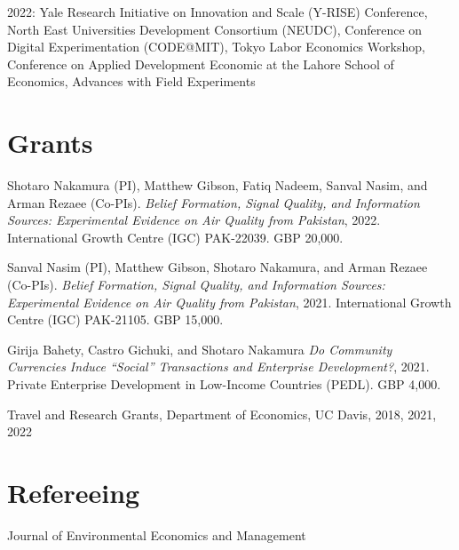\documentclass[10pt]{res} %
\begin{document}
\begin{resume}
		\hangindent=0.7cm 2022: Yale Research Initiative on Innovation and Scale (Y-RISE) Conference, North East Universities Development Consortium (NEUDC), Conference on Digital Experimentation (CODE@MIT), Tokyo Labor Economics Workshop, Conference on Applied Development Economic at the Lahore School of Economics, Advances with Field Experiments
		\vspace{-\baselineskip} 
		\section{Grants} 
		\hangindent=0.7cm  Shotaro Nakamura (PI), Matthew Gibson, Fatiq Nadeem, Sanval Nasim, and Arman Rezaee (Co-PIs). \textit{Belief Formation, Signal Quality, and Information Sources: Experimental Evidence on Air Quality from Pakistan}, 2022. International Growth Centre (IGC) PAK-22039. GBP 20,000. 
		
		\hangindent=0.7cm  Sanval Nasim (PI), Matthew Gibson, Shotaro Nakamura, and Arman Rezaee (Co-PIs). \textit{Belief Formation, Signal Quality, and Information Sources: Experimental Evidence on Air Quality from Pakistan}, 2021. International Growth Centre (IGC) PAK-21105. GBP 15,000. 
		
		\hangindent=0.7cm Girija Bahety, Castro Gichuki, and Shotaro Nakamura \textit{Do Community Currencies Induce ``Social'' Transactions and Enterprise Development?}, 2021. Private Enterprise Development in Low-Income Countries (PEDL). GBP 4,000. 
		
		\hangindent=0.7cm  Travel and Research Grants, Department of Economics, UC Davis,  \hfill 2018, 2021, 2022
	
		
		\section{Refereeing}
		Journal of Environmental Economics and Management
		\vspace{-\baselineskip} 

\end{resume}
\end{document}
